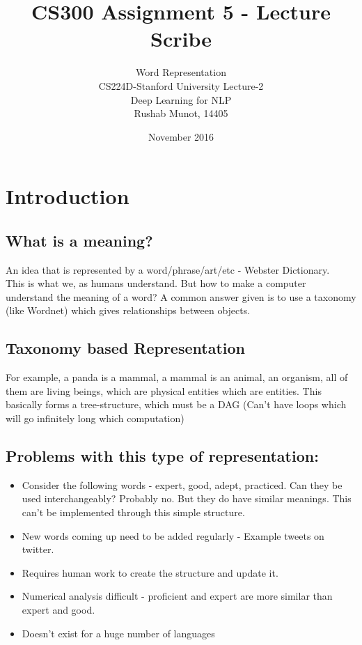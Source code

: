 \documentclass{article}
\title{CS300 Assignment 5 - Lecture Scribe}
\author{Word Representation\\CS224D-Stanford University Lecture-2\\ Deep Learning for NLP\\Rushab Munot, 14405 }
\date{November 2016}
\begin{document}
\maketitle
\section{Introduction}
\subsection{What is a meaning?}
\hspace{10pt} An idea that is represented by a word/phrase/art/etc - Webster Dictionary. \\
This is what we, as humans understand. But how to make a computer understand the meaning of a word? A common answer given is to use a taxonomy (like Wordnet) which gives relationships between objects.\\
\subsection{Taxonomy based Representation}
\hspace{10pt} For example, a panda is a mammal, a mammal is an animal, an organism, all of them are living beings, which are physical entities which are entities. This basically forms a tree-structure, which must be a DAG (Can't have loops which will go infinitely long which computation)

\subsection{Problems with this type of representation:}
\begin{itemize} 
    \item  Consider the following words - expert, good, adept, practiced. Can they be used interchangeably? Probably no. But they do have similar meanings. This can't be implemented through this simple structure.
    \item New words coming up need to be added regularly - Example tweets on twitter.
    \item Requires human work to create the structure and update it.
    \item Numerical analysis difficult - proficient and expert are more similar than expert and good.
    \item Doesn't exist for a huge number of languages
\end{itemize}
\end{document}
